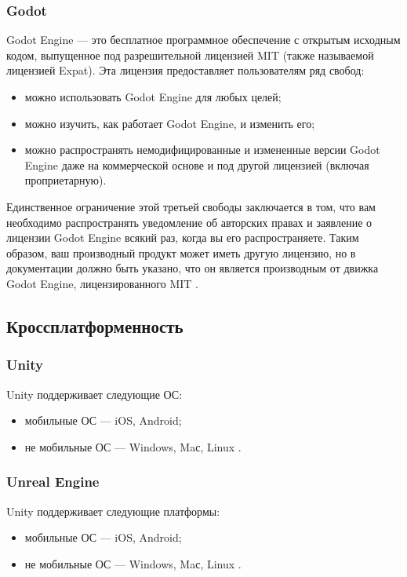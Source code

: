 \subsubsection{Godot}
Godot Engine --- это бесплатное программное обеспечение с открытым исходным кодом, выпущенное под разрешительной лицензией MIT (также называемой лицензией Expat). Эта лицензия предоставляет пользователям ряд свобод:
\begin{itemize}
\item можно использовать Godot Engine для любых целей;
\item можно изучить, как работает Godot Engine, и изменить его;
\item можно распространять немодифицированные и измененные версии Godot Engine даже на коммерческой основе и под другой лицензией (включая проприетарную).
\end{itemize}

Единственное ограничение этой третьей свободы заключается в том, что вам необходимо распространять уведомление об авторских правах и заявление о лицензии Godot Engine всякий раз, когда вы его распространяете. Таким образом, ваш производный продукт может иметь другую лицензию, но в документации должно быть указано, что он является производным от движка Godot Engine, лицензированного MIT \cite{godot}.

\subsection{Кроссплатформенность}
\subsubsection{Unity}
Unity поддерживает следующие ОС:
\begin{itemize}
\item мобильные ОС --- iOS, Android;
\item не мобильные ОС --- Windows, Maс, Linux \cite{unity_comp}.
\end{itemize}
\subsubsection{Unreal Engine}
Unity поддерживает следующие платформы:
\begin{itemize}
\item мобильные ОС --- iOS, Android;
\item не мобильные ОС --- Windows, Maс, Linux \cite{unreal_comp}.
\end{itemize}
